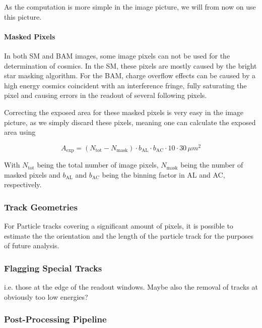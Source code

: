 \documentclass[a4paper, 11pt]{article}
\begin{document}
As the computation is more simple in the image picture, we will from now on use this picture.

\paragraph{Masked Pixels\\}

In both SM and BAM images, some image pixels can not be used for the determination of cosmics. In the SM, these pixels are mostly caused by the bright star masking algorithm. For the BAM, charge overflow effects can be caused by a high energy cosmics coincident with an interference fringe, fully saturating the pixel and causing errors in the readout of several following pixels.

Correcting the exposed area for these masked pixels is very easy in the image picture, as we simply discard these pixels, meaning one can calculate the exposed area using

\begin{equation*}
  A_\mathrm{exp} = (N_\mathrm{tot} - N_\mathrm{mask}) \cdot b_\mathrm{AL} \cdot b_\mathrm{AC} \cdot 10 \cdot 30 \, \mu m^{2}
\end{equation*}

With $N_\mathrm{tot}$ being the total number of image pixels, $N_\mathrm{mask}$ being the number of masked pixels and $b_\mathrm{AL}$ and $b_\mathrm{AC}$ being the binning factor in AL and AC, respectively.


\subsubsection{Track Geometries}

For Particle tracks covering a significant amount of pixels, it is possible to estimate the the orientation and the length of the particle track for the purposes of future analysis.

\subsubsection{Flagging Special Tracks}

i.e. those at the edge of the readout windows. Maybe also the removal of tracks at obviously too low energies?


\subsubsection{Post-Processing Pipeline}
\end{document}
